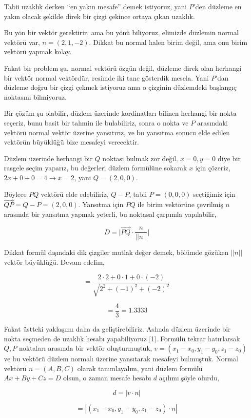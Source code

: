 \documentclass[12pt,fleqn]{article}\usepackage{../../common}
\begin{document}
Tabii uzaklık derken ``en yakın mesafe'' demek istiyoruz, yani $P$'den düzleme
en yakın olacak şekilde direk bir çizgi çekince ortaya çıkan uzaklık.

Bu yön bir vektör gerektirir, ama bu yönü biliyoruz, elimizde düzlemin normal
vektörü var, $n = (2,1,-2)$. Dikkat bu normal halen birim değil, ama onu birim
vektörü yapmak kolay.

Fakat bir problem şu, normal vektörü özgün değil, düzleme direk olan herhangi
bir vektör normal vektördür, resimde iki tane gösterdik mesela. Yani $P$'dan
düzleme doğru bir çizgi çekmek istiyoruz ama o çizginin düzlemdeki başlangıç
noktasını bilmiyoruz. 

Bir çözüm şu olabilir, düzlem üzerinde kordinatları bilinen herhangi bir nokta
seçeriz, bunu basit bir tahmin ile bulabiliriz, sonra o nokta ve $P$ arasındaki
vektörü normal vektör üzerine yansıtırız, ve bu yansıtma sonucu elde edilen
vektörün büyüklüğü bize mesafeyi verecektir.

Düzlem üzerinde herhangi bir $Q$ noktası bulmak zor değil, $x=0,y=0$ diye bir
rasgele seçim yaparız, bu değerleri düzlem formülüne sokarak $x$ için çözeriz,
$2x + 0 + 0 = 4 \to x = 2$, yani $Q = (2,0,0)$.

Böylece $PQ$ vektörü elde edebiliriz, $Q - P$, tabii $P = (0,0,0)$ seçtiğimiz
için $\vec{QP} = Q - P = (2,0,0)$. Yansıtma için $PQ$ ile birim vektörüne
çevrilmiş $n$ arasında bir yansıtma yapmak yeterli, bu noktasal çarpımla
yapılabilir,

$$
D =  \bigg| \vec{PQ} \cdot \frac{n}{||n||} \bigg|
$$

Dikkat formül dışındaki dik çizgiler mutlak değer demek, bölümde gözüken $||n||$
vektör büyüklüğü. Devam edelim,

$$
= \frac{2 \cdot 2 + 0 \cdot 1 + 0 \cdot (-2) }{ \sqrt{2^2 + (-1)^2 + (-2)^2} } 
$$

$$
= \frac{4}{3} = 1.3333
$$

Fakat üstteki yaklaşımı daha da geliştirebiliriz. Aslında düzlem üzerinde bir
nokta seçmeden de uzaklık hesabı yapabiliyoruz [1]. Formülü tekrar hatırlarsak
$Q,P$ noktaları arasında bir vektör oluşturmuştuk, $v = (x_1-x_0, y_1-y_0, z_1-z_0)$
ve bu vektörü düzlem normalı üzerine yansıtarak mesafeyi bulmuştuk. Normal
vektörü $n = (A,B,C)$ olarak tanımlayalım, yani düzlem formülü $Ax+By+Cz=D$
olsun, o zaman mesafe hesabı $d$ açılımı şöyle olurdu,

$$
d = | v \cdot n|
$$

$$
= | (x_1-x_0, y_1-y_0, z_1-z_0) \cdot n | 
$$
\end{document}
